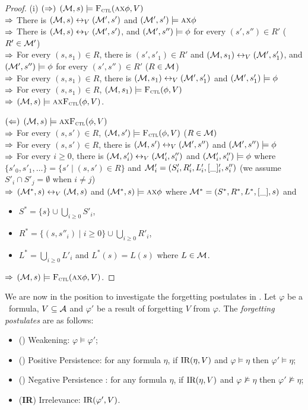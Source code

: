 \documentclass[twoside,11pt]{article}
\begin{document}
\begin{proof}
  (i) $(\Rightarrow)$ $({\cal M},s)\models{\textsc{F}_{\textsc{ctl}}}(\textsc{a}\textsc{x}\phi,V)$\\
  $\Rightarrow$ There is $({\cal M},s)\leftrightarrow_V({\cal M}',s')$ and $({\cal M}',s')\models \textsc{a}\textsc{x}\phi$\\
  $\Rightarrow$ There is $({\cal M},s)\leftrightarrow_V({\cal M}',s')$, and $({\cal M}',s'')\models \phi$ for every $(s',s'')\in R'$ ($R'\in{\cal M}'$)\\
  $\Rightarrow$ For every $(s,s_1)\in R$, there is $(s',s'_1)\in R'$ and $({\cal M},s_1)\leftrightarrow_V({\cal M}',s'_1)$, and
   $({\cal M}',s'')\models \phi$ for every $(s',s'')\in R'$ ($R\in {\cal M}$)\\
  $\Rightarrow$ For every $(s,s_1)\in R$, there is $({\cal M},s_1)\leftrightarrow_V({\cal M}',s'_1)$ and $({\cal M}',s'_1)\models\phi$\\
  $\Rightarrow$ For every $(s,s_1)\in R$, $({\cal M},s_1)\models{\textsc{F}_{\textsc{ctl}}}(\phi,V)$\\
  $\Rightarrow$ $({\cal M},s)\models\textsc{a}\textsc{x}{\textsc{F}_{\textsc{ctl}}}(\phi,V)$.

  $(\Leftarrow)$ $({\cal M},s)\models\textsc{a}\textsc{x}{\textsc{F}_{\textsc{ctl}}}(\phi,V)$\\
  $\Rightarrow$ For every $(s,s')\in R$, $({\cal M},s')\models{\textsc{F}_{\textsc{ctl}}}(\phi,V)$ ($R\in {\cal M})$\\
  $\Rightarrow$ For every $(s,s')\in R$, there is $({\cal M},s')\leftrightarrow_V({\cal M}',s'')$ and $({\cal M}',s'')\models\phi$\\
  $\Rightarrow$ For every $i\ge 0$, there is $({\cal M},s'_i)\leftrightarrow_V({\cal M}'_i,s''_i)$ and $({\cal M}'_i,s''_i)\models\phi$
  where $\{s'_0,s'_1,\ldots\}=\{s'\mid (s,s')\in R\}$ and ${\cal M}'_i=(S'_i,R'_i,L'_i,[\_]'_i,s''_i)$ (we assume $S'_i\cap S'_j=\emptyset$ when $i\neq j$)\\
  $\Rightarrow$ $({\cal M}^*,s)\leftrightarrow_V({\cal M},s)$ and $({\cal M}^*,s)\models\textsc{a}\textsc{x}\phi$ where
  ${\cal M}^*=(S^*,R^*,L^*,[\_], s)$ and
  \begin{itemize}
    \item $S^*=\{s\}\cup\bigcup_{i\ge 0}S'_i$,
    \item $R^*=\{(s,s''_i)\mid i\ge 0\}\cup \bigcup_{i\ge 0} R'_i$,
    \item $L^*=\bigcup_{i\ge 0}L'_i$ and $L^*(s)=L(s)$ where $L\in{\cal M}$.
  \end{itemize}
  $\Rightarrow$ $({\cal M},s)\models {\textsc{F}_{\textsc{ctl}}}(\textsc{a}\textsc{x}\phi,V)$.
\end{proof}

We are now in the position to investigate the forgetting postulates in \CTL.
Let $\varphi$ be a \CTL\ formula,  $V\subseteq\cal A$ and  $\varphi'$ be a result of
forgetting $V$ from $\varphi$.
The {\em forgetting postulates} are as follows:
\begin{itemize}
	\item[] (\W) Weakening: $\varphi \models \varphi'$;
	\item[] (\PP) Positive Persistence:
	for any formula $\eta$, if $\textrm{IR}(\eta, V)$ and $\varphi \models \eta$ then $\varphi' \models \eta$;
	\item[] (\NgP) Negative Persistence :  for any formula $\eta$,  if $\textrm{IR}(\eta, V)$ and $\varphi \not \models \eta$ then $\varphi' \not \models \eta$;
	\item[] (\textbf{IR}) Irrelevance: $\textrm{IR}(\varphi', V)$.
\end{itemize}
\end{document}
